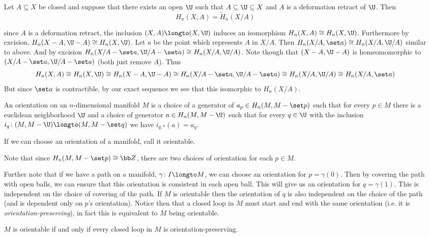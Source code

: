 \bthrm

    Let $A\subseteq X$ be closed and suppose that there exists an open $\U$ such that $A\subseteq\U\subseteq X$ and $A$ is a deformation retract of $\U$.
    Then
    $$ H_n(X,A) = \tilde H_n(X/A) $$

\ethrm

\Proof since $A$ is a deformation retract, the inclusion $(X,A)\longto(X,\U)$ induces an isomorphism $H_n(X,A)\cong H_n(X,\U)$.
Furthermore by excision, $H_n(X-A,\U-A)\cong H_n(X,\U)$.
Let $a$ be the point which represents $A$ in $X/A$.
Then $H_n(X/A,\set a)\cong H_n(X/A,\U/A)$ similar to above.
And by excision $H_n(X/A-\set a,\U/A-\set a)\cong H_n(X/A,\U/A)$.
Note though that $(X-A,\U-A)$ is homeomomorphic to $(X/A-\set a,\U/A-\set a)$ (both just remove $A$).
Thus
$$ H_n(X,A) \cong H_n(X,\U) \cong H_n(X-A,\U-A) \cong H_n(X/A-\set a,\U/A-\set a) \cong H_n(X/A,\U/A) \cong H_n(X/A,\set a) $$
But since $\set a$ is contractible, by our exact sequence we see that this isomorphic to $H_n(X/A)$.

\bdefn

    An {\emphcolor orientation} on an $n$-dimensional manifold $M$ is a choice of a generator of $a_p\in H_n(M,M-\set p)$ such that for every $p\in M$ there is a euclidean neighborhood $\U$ and a choice
    of generator $a\in H_n(M,M-\U)$ such that for every $q\in\U$ with the inclusion $i_q\colon(M,M-\U)\longto(M,M-\set q)$ we have $i_{q,*}(a)=a_q$.

    If we can choose an orientation of a manifold, call it {\emphcolor orientable}.

\edefn

Note that since $H_n(M,M-\set p)\cong{\bb Z}$, there are two choices of orientation for each $p\in M$.

Further note that if we have a path on a manifold, $\gamma\colon I\longto M$, we can choose an orientation for $p=\gamma(0)$.
Then by covering the path with open balls, we can ensure that this orientation is consistent in each open ball.
This will give us an orientation for $q=\gamma(1)$.
This is independent on the choice of covering of the path.
If $M$ is orientable then the orientation of $q$ is also independent on the choice of the path (and is dependent only on $p$'s orientation).
Notice then that a closed loop in $M$ must start and end with the same orientation (i.e. it is {\it orientation-preserving}), in fact this is equivalent to $M$ being orientable.

\bthrm

    $M$ is orientable if and only if every closed loop in $M$ is orientation-preserving.

